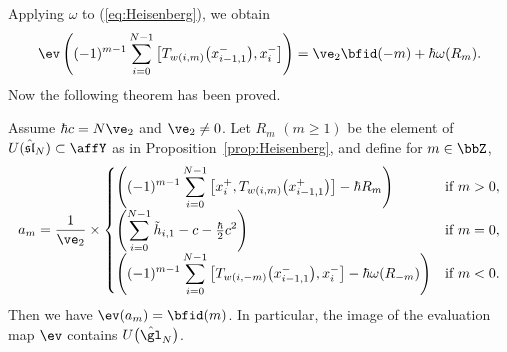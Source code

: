 Applying $\omega$ to (\ref{eq:Heisenberg}), we obtain
\begin{gather*}
\ev\left( (-1)^{m-1} \sum_{i=0}^{N-1} \big[T_{w(i,m)}\big(x_{i-1,1}^-\big), x_{i}^-\big] \right) = \ve_2 \bfid(-m) + \hbar \omega(R_m).
\end{gather*}
Now the following theorem has been proved.
\begin{thm}\label{thm:image}Assume $\hbar c =N\ve_2$ and $\ve_2 \neq 0$. Let $R_m$ $(m \geq 1)$ be the element of $U(\hat{\mathfrak{sl}}_N) \subset \affY$ as in Proposition~{\rm \ref{prop:Heisenberg}}, and define for $m \in \bbZ$,
\begin{gather*}
a_{m} = \dfrac{1}{\ve_2} \times \begin{cases}
\displaystyle \left( (-1)^{m-1} \sum_{i=0}^{N-1} \big[x_{i}^+, T_{w(i,m)}\big(x_{i-1,1}^+\big)\big] - \hbar R_m\right) & \text{if $m>0$},\\
\displaystyle \left( \sum_{i=0}^{N-1} \tilde{h}_{i,1} - c - \tfrac{\hbar}{2} c^2\right) & \text{if $m=0$},\\
\displaystyle \left((-1)^{m-1} \sum_{i=0}^{N-1} \big[T_{w(i,-m)}\big(x_{i-1,1}^-\big),x_{i}^-\big] - \hbar \omega(R_{-m})\right) & \text{if $m<0$}.
\end{cases}
\end{gather*}
Then we have $\ev(a_m) = \bfid(m)$. In particular, the image of the evaluation map $\ev$ contains $U\big(\hat{\gl}_N\big)$.
\end{thm}
